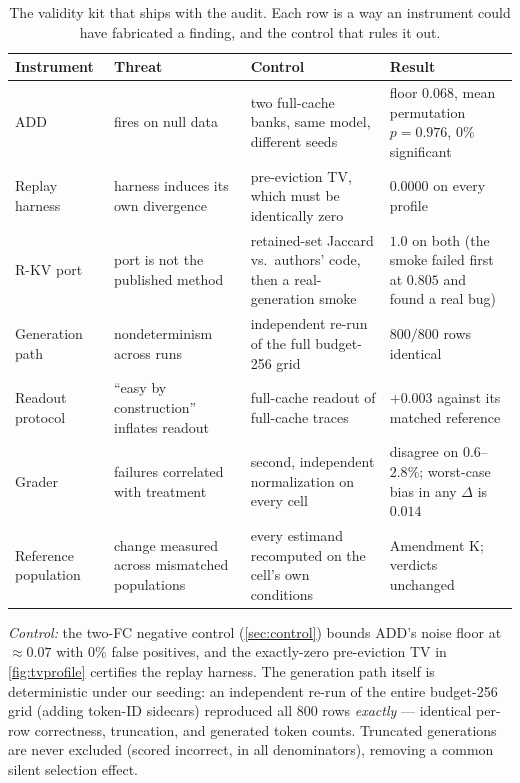 \documentclass{article}
\begin{document}
\begin{table}[t]\centering
\caption{The validity kit that ships with the audit. Each row is a way an instrument could have fabricated a finding, and the control that rules it out.}\label{tab:validity}\footnotesize
\begin{tabular}{p{2.3cm}p{3.0cm}p{3.2cm}p{3.2cm}}
\toprule
Instrument & Threat & Control & Result \\
\midrule
ADD & fires on null data & two full-cache banks, same model, different seeds & floor $0.068$, mean permutation $p = 0.976$, $0\%$ significant \\
Replay harness & harness induces its own divergence & pre-eviction TV, which must be identically zero & $0.0000$ on every profile \\
R-KV port & port is not the published method & retained-set Jaccard vs.\ authors' code, then a real-generation smoke & $1.0$ on both (the smoke failed first at $0.805$ and found a real bug) \\
Generation path & nondeterminism across runs & independent re-run of the full budget-256 grid & $800/800$ rows identical \\
Readout protocol & ``easy by construction'' inflates readout & full-cache readout of full-cache traces & $+0.003$ against its matched reference \\
Grader & failures correlated with treatment & second, independent normalization on every cell & disagree on $0.6$--$2.8\%$; worst-case bias in any $\Delta$ is $0.014$ \\
Reference population & change measured across mismatched populations & every estimand recomputed on the cell's own conditions & Amendment K; verdicts unchanged \\
\bottomrule
\end{tabular}
\end{table}

\emph{Control:} the two-FC negative control (\cref{sec:control}) bounds ADD's noise floor at $\approx 0.07$ with $0\%$ false positives, and the exactly-zero pre-eviction TV in \cref{fig:tvprofile} certifies the replay harness. The generation path itself is deterministic under our seeding: an independent re-run of the entire budget-256 grid (adding token-ID sidecars) reproduced all 800 rows \emph{exactly} --- identical per-row correctness, truncation, and generated token counts. Truncated generations are never excluded (scored incorrect, in all denominators), removing a common silent selection effect.
\end{document}
